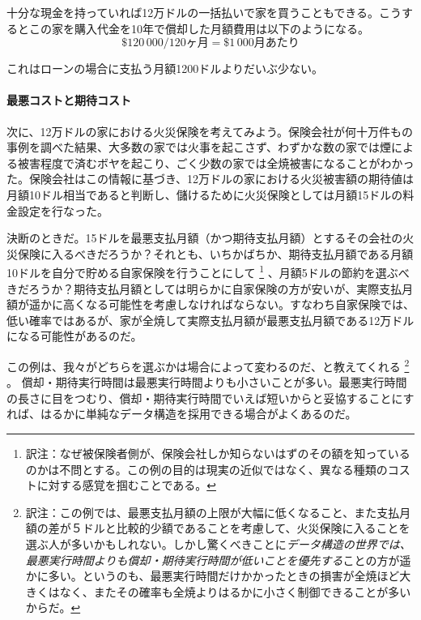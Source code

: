 十分な現金を持っていれば12万ドルの一括払いで家を買うこともできる。こうするとこの家を購入代金を10年で償却した月額費用は以下のようになる。
\[
   \$120\,000 / 120\text{ヶ月} = \$1\,000\text{月あたり}
\]

これはローンの場合に支払う月額1200ドルよりだいぶ少ない。

\paragraph{最悪コストと期待コスト}
次に、12万ドルの家における火災保険を考えてみよう。保険会社が何十万件もの事例を調べた結果、大多数の家では火事を起こさず、わずかな数の家では煙による被害程度で済むボヤを起こり、ごく少数の家では全焼被害になることがわかった。保険会社はこの情報に基づき、12万ドルの家における火災被害額の期待値は月額10ドル相当であると判断し、儲けるために火災保険としては月額15ドルの料金設定を行なった。

決断のときだ。15ドルを最悪支払月額（かつ期待支払月額）とするその会社の火災保険に入るべきだろうか？それとも、いちかばちか、期待支払月額である月額10ドルを自分で貯める自家保険を行うことにして
\footnote{訳注：なぜ被保険者側が、保険会社しか知らないはずのその額を知っているのかは不問とする。この例の目的は現実の近似ではなく、異なる種類のコストに対する感覚を掴むことである。}
、月額5ドルの節約を選ぶべきだろうか？期待支払月額としては明らかに自家保険の方が安いが、実際支払月額が遥かに高くなる可能性を考慮しなければならない。すなわち自家保険では、低い確率ではあるが、家が全焼して実際支払月額が最悪支払月額である12万ドルになる可能性があるのだ。

この例は、我々がどちらを選ぶかは場合によって変わるのだ、と教えてくれる
\footnote{訳注：この例では、最悪支払月額の上限が大幅に低くなること、また支払月額の差が５ドルと比較的少額であることを考慮して、火災保険に入ることを選ぶ人が多いかもしれない。しかし驚くべきことに\emph{データ構造の世界では、最悪実行時間よりも償却・期待実行時間が低いことを優先する}ことの方が遥かに多い。というのも、最悪実行時間だけかかったときの損害が全焼ほど大きくはなく、またその確率も全焼よりはるかに小さく制御できることが多いからだ。}
。
償却・期待実行時間は最悪実行時間よりも小さいことが多い。最悪実行時間の長さに目をつむり、償却・期待実行時間でいえば短いからと妥協することにすれば、はるかに単純なデータ構造を採用できる場合がよくあるのだ。

